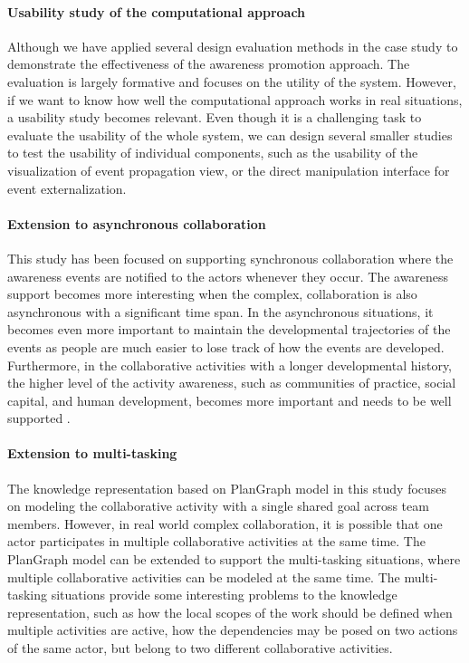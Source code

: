\paragraph*{Usability study of the computational approach} %
\label{par:usability_study_of_the_prototype_system}
Although we have applied several design evaluation methods in the case study to demonstrate the effectiveness of the awareness promotion approach. The evaluation is largely formative and focuses on the utility of the system. However, if we want to know how well the computational approach works in real situations, a usability study becomes relevant. Even though it is a challenging task to evaluate the usability of the whole system, we can design several smaller studies to test the usability of individual components, such as the usability of the visualization of event propagation view, or the direct manipulation interface for event externalization.

\paragraph*{Extension to asynchronous collaboration} %
\label{par:extension_to_asynchronous_collaboration}
This study has been focused on supporting synchronous collaboration where the awareness events are notified to the actors whenever they occur. The awareness support becomes more interesting when the complex, collaboration is also asynchronous with a significant time span. In the asynchronous situations, it becomes even more important to maintain the developmental trajectories of the events as people are much easier to lose track of how the events are developed. Furthermore, in the collaborative activities with a longer developmental history, the higher level of the activity awareness, such as communities of practice, social capital, and human development, becomes more important and needs to be well supported \cite{carroll2006a}.

\paragraph*{Extension to multi-tasking} %
\label{par:extension_to_multi_tasking}
The knowledge representation based on PlanGraph model in this study focuses on modeling the collaborative activity with a single shared goal across team members. However, in real world complex collaboration, it is possible that one actor participates in multiple collaborative activities at the same time. The PlanGraph model can be extended to support the multi-tasking situations, where multiple collaborative activities can be modeled at the same time. The multi-tasking situations provide some interesting problems to the knowledge representation, such as how the local scopes of the work should be defined when multiple activities are active, how the dependencies may be posed on two actions of the same actor, but belong to two different collaborative activities.
